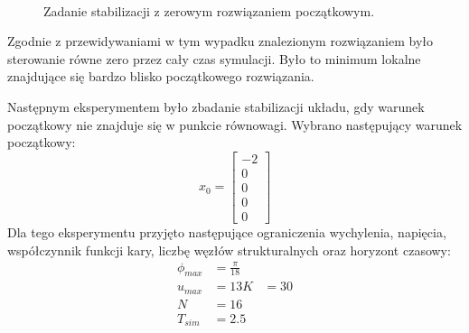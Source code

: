 \begin{figure}[H]
	~~
	\caption{Zadanie stabilizacji z zerowym rozwiązaniem początkowym.}
	\label{fig:zero}
\end{figure}

Zgodnie z przewidywaniami w tym wypadku znalezionym rozwiązaniem było sterowanie równe zero przez cały czas symulacji. Było to minimum lokalne znajdujące się bardzo blisko początkowego rozwiązania.

\newpage
Następnym eksperymentem było zbadanie stabilizacji układu, gdy warunek początkowy nie znajduje się w punkcie równowagi. Wybrano następujący warunek początkowy:
\begin{equation}
x_0=\begin{bmatrix}
-2\\
0\\
0\\
0\\
0
\end{bmatrix}
\end{equation}
Dla tego eksperymentu przyjęto następujące ograniczenia wychylenia, napięcia, współczynnik funkcji kary, liczbę węzłów strukturalnych oraz horyzont czasowy:
\begin{equation}
\begin{aligned}
\phi_{max}&=\frac{\pi}{18}\\
u_{max}&=13
K&=30\\
N&=16\\
T_{sim}&=2.5
\end{aligned}
\end{equation}

